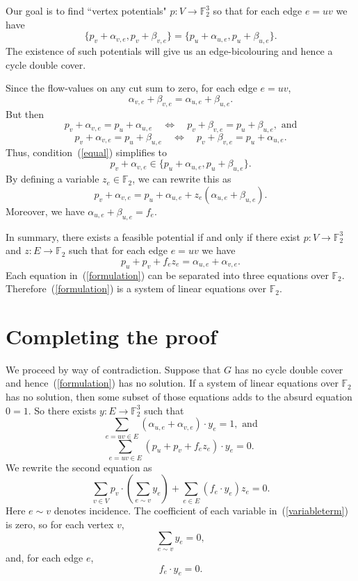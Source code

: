 \documentclass[12pt,reqno]{amsart}
\newcommand{\bF}{\mathbb F}
\begin{document}
Our goal is to find ``vertex potentials" $p:V\rightarrow \bF_2^3$ so that for each edge $e=uv$ we have
\begin{equation}\label{equal}
 \{p_v+\alpha_{v,e},p_v+\beta_{v,e}\} = \{p_u+\alpha_{u,e},p_u+\beta_{u,e}\}.
\end{equation}
The existence of such potentials will give us an edge-bicolouring and hence a cycle double cover.

Since the flow-values on any cut sum to zero, for each edge $e=uv$,
$$ \alpha_{v,e}+\beta_{v,e} = \alpha_{u,e}+\beta_{u,e}.$$
But then 
$$ p_v+\alpha_{v,e}=p_u+\alpha_{u,e} \quad \Leftrightarrow\quad p_v+\beta_{v,e}=p_u+\beta_{u,e},\mbox{ and}$$
$$ p_v+\alpha_{v,e}=p_u+\beta_{u,e} \quad \Leftrightarrow\quad p_v+\beta_{v,e}=p_u+\alpha_{u,e}.$$
Thus, condition~(\ref{equal}) simplifies to
$$ p_v+\alpha_{v,e} \in \{p_u+\alpha_{u,e},p_u+\beta_{u,e}\}.$$
By defining a variable $z_e\in\bF_2$, we can rewrite this as
$$ p_v+\alpha_{v,e} = p_u+\alpha_{u,e} + z_e(\alpha_{u,e}+\beta_{u,e}).$$
Moreover, we have $\alpha_{u,e}+\beta_{u,e}=f_e.$

In summary, there exists a feasible potential if and only if there exist $p:V\rightarrow \bF_2^3$ and $z:E\rightarrow \bF_2$ such that
for each edge $e=uv$ we have
\begin{equation}\label{formulation}
 p_u+p_v +f_ez_e = \alpha_{u,e}+\alpha_{v,e}.
\end{equation}
Each equation in~(\ref{formulation}) can be separated into three equations over $\bF_2$.
Therefore~(\ref{formulation}) is a system of linear equations over $\bF_2$.


\section{Completing the proof}

We proceed by way of contradiction. Suppose that $G$ has no cycle double cover and hence~(\ref{formulation}) has no solution.
If a system of linear equations over $\bF_2$ has no solution, then some subset of those equations adds to the absurd equation $0=1$.
So there exists $y:E\rightarrow \bF_2^3$ such that
\begin{equation}\label{constantterm}
\sum_{e=uv\in E} (\alpha_{u,e}+\alpha_{v,e})\cdot y_e = 1, \mbox{ and}
\end{equation}
$$ \sum_{e=uv\in E} (p_u+p_v +f_ez_e)\cdot y_e = 0.$$
We rewrite the second equation as
\begin{equation}\label{variableterm}
 \sum_{v\in V} p_v\cdot\left(\sum_{e\sim v} y_e\right) + \sum_{e\in E} (f_e\cdot y_e) z_e =0. 
\end{equation}
Here $e\sim v$ denotes incidence. The coefficient of each variable in~(\ref{variableterm}) is zero, so
for each vertex $v$,
\begin{equation}\label{flow}
 \sum_{e\sim v} y_e  =0,
\end{equation}
and, for each edge $e$,
\begin{equation}\label{orthogonal}
  f_e\cdot y_e=0.
\end{equation}
\end{document}
